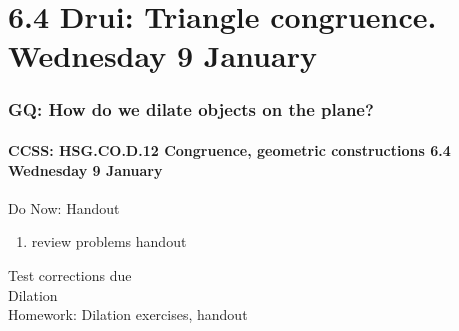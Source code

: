 \documentclass{beamer}
\begin{document}
  \section{6.4 Drui: Triangle congruence. Wednesday 9 January}
    \frame
    {
      \frametitle{GQ: How do we dilate  objects on the plane?}
      \framesubtitle{CCSS: HSG.CO.D.12 Congruence, geometric constructions  \alert{6.4 Wednesday 9 January}}

      \begin{block}{Do Now: Handout}
        \begin{enumerate}
          \item review problems handout
        \end{enumerate}
      \end{block}
      Test corrections due\\
      Dilation \\[0.5cm]
      Homework: Dilation exercises, handout\\
    }
\end{document}

